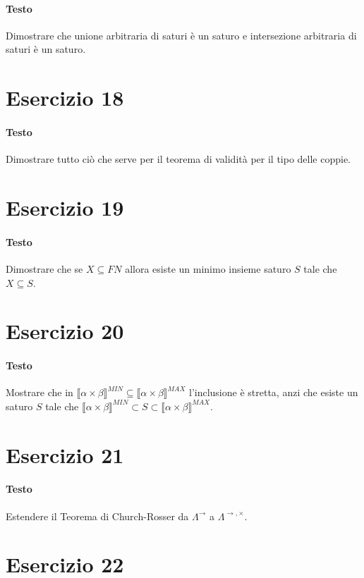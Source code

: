\documentclass[a4paper,10pt]{article}
\begin{document}
\paragraph{Testo}
Dimostrare che unione arbitraria di saturi è un saturo e intersezione arbitraria di saturi è un saturo.

\section*{Esercizio 18}
\paragraph{Testo}
Dimostrare tutto ciò che serve per il teorema di validità per il tipo delle coppie.

\section*{Esercizio 19}
\paragraph{Testo}
Dimostrare che se $X \subseteq F N$ allora esiste un minimo insieme saturo $S$ tale che $X \subseteq S$.

\section*{Esercizio 20}
\paragraph{Testo}
Mostrare che in $\llbracket \alpha \times \beta \rrbracket^{MIN} \subseteq \llbracket \alpha \times \beta \rrbracket^{MAX}$ l’inclusione è stretta, anzi che esiste un saturo $S$ tale che $\llbracket \alpha \times \beta \rrbracket^{MIN} \subset S \subset \llbracket \alpha \times \beta \rrbracket^{MAX}$.

\section*{Esercizio 21}
\paragraph{Testo}
Estendere il Teorema di Church-Rosser da $\Lambda^\rightarrow$ a $\Lambda^{\rightarrow, \times}$.

\section*{Esercizio 22}
\end{document}
